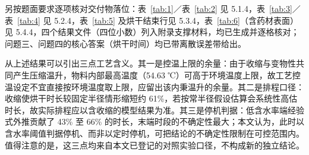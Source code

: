 另按题面要求逐项核对交付物落位：表~\ref{tab:1}／表~\ref{tab:2} 见 5.1.4，表~\ref{tab:3}／表~\ref{tab:4} 见 5.2.4，表~\ref{tab:5} 及烘干结束行见 5.3.4，表~\ref{tab:6}（含药材表面）见 5.4.4，四个结果文件（四位小数）列入附录支撑材料，均已生成并逐格核对；问题三、问题四的核心答案（烘干时间）均已带离散误差带给出。

从上述结果可以引出三点工艺含义。其一是控温上限的余量：由于收缩与变物性共同产生压缩温升，物料内部最高温度（54.63 ℃）可高于环境温度上限，故工艺控温设定不宜直接按环境温度取上限，应留出该内秉温升的余量。其二是排程口径：收缩使烘干时长较固定半径情形缩短约 61\%，若按常半径假设估算会系统性高估时长，故实际排程应以含收缩的模型结果为准。其三是停机判据：低含水率端经验式外推贡献了 43\% 至 66\% 的时长，末端时段的不确定性最大；本文认为，此时以含水率阈值判据停机、而非以定时停机，可把结论的不确定性限制在可控范围内。值得注意的是，这三点均来自本文已登记的对照实验口径，不构成新的独立结论。
